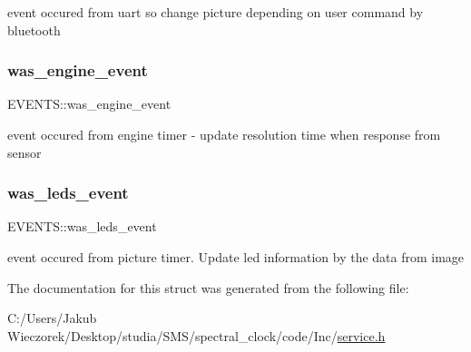 event occured from uart so change picture depending on user command by bluetooth \mbox{\label{struct_e_v_e_n_t_s_a371d5734376c3dc2b5fb41e8f5cfeb3c}} 
\subsubsection{\texorpdfstring{was\+\_\+engine\+\_\+event}{was\_engine\_event}}
{\footnotesize\ttfamily E\+V\+E\+N\+T\+S\+::was\+\_\+engine\+\_\+event}

event occured from engine timer -\/ update resolution time when response from sensor \mbox{\label{struct_e_v_e_n_t_s_a7cbf97b5ba85d6edc3cac909ef10e55c}} 
\subsubsection{\texorpdfstring{was\+\_\+leds\+\_\+event}{was\_leds\_event}}
{\footnotesize\ttfamily E\+V\+E\+N\+T\+S\+::was\+\_\+leds\+\_\+event}

event occured from picture timer. Update led information by the data from image 

The documentation for this struct was generated from the following file\+:\begin{DoxyCompactItemize}
\item 
C\+:/\+Users/\+Jakub Wieczorek/\+Desktop/studia/\+S\+M\+S/spectral\+\_\+clock/code/\+Inc/\mbox{\hyperlink{service_8h}{service.\+h}}\end{DoxyCompactItemize}
